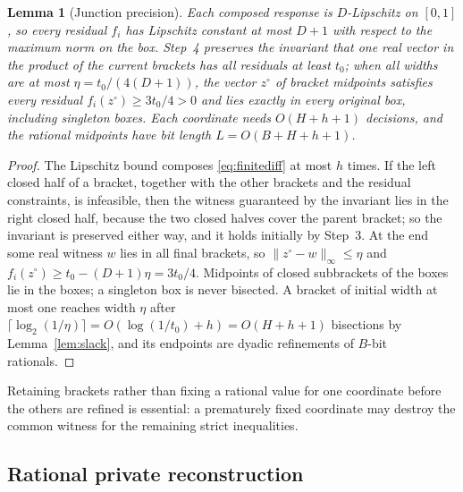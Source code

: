 \documentclass[11pt,a4paper]{article}
\theoremstyle{plain}
\newtheorem{lemma}[theorem]{Lemma}
\theoremstyle{definition}
\theoremstyle{remark}
\begin{document}
\begin{lemma}[Junction precision]\label{lem:precision}
Each composed response is $D$-Lipschitz on $[0,1]$, so every residual $f_i$ has Lipschitz constant at most $D+1$ with respect to the maximum norm on the box. Step~4 preserves the invariant that one real vector in the product of the current brackets has all residuals at least $t_0$; when all widths are at most $\eta=t_0/(4(D+1))$, the vector $z^\circ$ of bracket midpoints satisfies every residual $f_i(z^\circ)\ge 3t_0/4>0$ and lies exactly in every original box, including singleton boxes. Each coordinate needs $O(H+h+1)$ decisions, and the rational midpoints have bit length $L=O(B+H+h+1)$.
\end{lemma}

\begin{proof}
The Lipschitz bound composes \eqref{eq:finitediff} at most $h$ times. If the left closed half of a bracket, together with the other brackets and the residual constraints, is infeasible, then the witness guaranteed by the invariant lies in the right closed half, because the two closed halves cover the parent bracket; so the invariant is preserved either way, and it holds initially by Step~3. At the end some real witness $w$ lies in all final brackets, so $\|z^\circ-w\|_\infty\le\eta$ and $f_i(z^\circ)\ge t_0-(D+1)\eta=3t_0/4$. Midpoints of closed subbrackets of the boxes lie in the boxes; a singleton box is never bisected. A bracket of initial width at most one reaches width $\eta$ after $\lceil\log_2(1/\eta)\rceil=O(\log(1/t_0)+h)=O(H+h+1)$ bisections by Lemma~\ref{lem:slack}, and its endpoints are dyadic refinements of $B$-bit rationals.
\end{proof}

Retaining brackets rather than fixing a rational value for one coordinate before the others are refined is essential: a prematurely fixed coordinate may destroy the common witness for the remaining strict inequalities.

\subsection{Rational private reconstruction}
\end{document}
